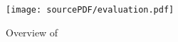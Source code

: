\begin{figure}[ht]
\centering
\texttt{[image: sourcePDF/evaluation.pdf]}
\vspace{-0.2cm}
\caption{Overview of \eval}
\label{fig:evalutation}
\vspace{-0.3cm}
\end{figure}